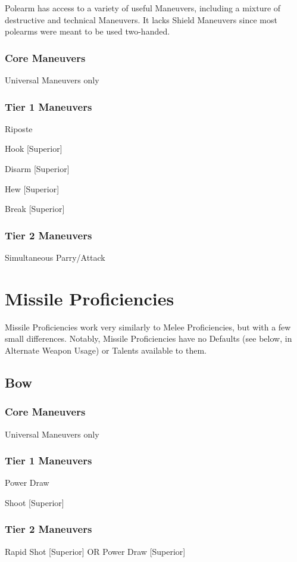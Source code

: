\documentclass[oneside,11pt,english]{book}
\begin{document}
Polearm has access to a variety of useful Maneuvers, including a mixture of destructive and technical 
Maneuvers. It lacks Shield Maneuvers since most polearms were meant to be used two-handed. 

\subsubsection{Core Maneuvers}
Universal Maneuvers only

\subsubsection{Tier 1 Maneuvers}
Riposte 

Hook [Superior] 

Disarm [Superior] 

Hew [Superior] 

Break [Superior] 

\subsubsection{Tier 2 Maneuvers}
Simultaneous Parry/Attack 

\section{Missile Proficiencies}
Missile Proficiencies work very similarly to Melee Proficiencies, but with a few small differences. 
Notably, Missile Proficiencies have no Defaults (see below, in Alternate Weapon Usage) or Talents 
available to them. 

\subsection{Bow}
\subsubsection{Core Maneuvers}
Universal Maneuvers only 

\subsubsection{Tier 1 Maneuvers}
Power Draw 

Shoot [Superior]

\subsubsection{Tier 2 Maneuvers}
Rapid Shot [Superior] OR Power Draw [Superior]
\end{document}
